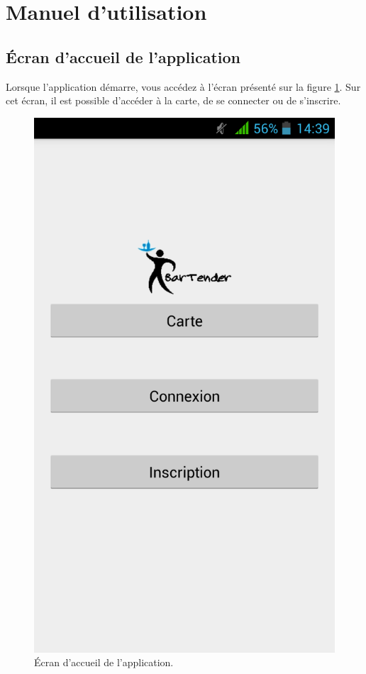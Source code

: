 

\section{Manuel d'utilisation}
\subsection{Écran d'accueil de l'application}
Lorsque l'application démarre, vous accédez à l'écran
présenté sur la figure \ref{fig:main-menu}. Sur cet écran,
il est possible d'accéder à la carte, de se connecter ou de
s'inscrire.

\begin{figure}[H]
	\centering
	\includegraphics[scale=0.15]{img/main-menu.png}
	\caption{Écran d'accueil de l'application.}
	\label{fig:main-menu}
\end{figure}

